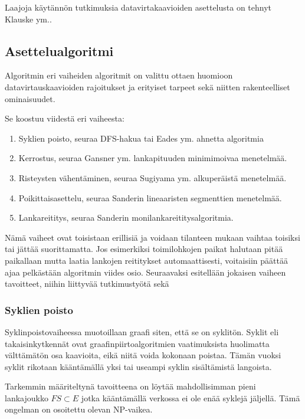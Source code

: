 \documentclass[finnish,12pt]{article}
\begin{document}
Laajoja käytännön tutkimuksia datavirtakaavioiden asettelusta on tehnyt Klauske ym.\cite{RefWorks:50}.

		\subsection{Asettelualgoritmi}

Algoritmin eri vaiheiden algoritmit on valittu ottaen huomioon datavirtauskaavioiden rajoitukset ja erityiset tarpeet sekä niitten rakenteelliset ominaisuudet.

Se koostuu viidestä eri vaiheesta:
\begin{enumerate}
  \item Syklien poisto, seuraa DFS-hakua \cite{RefWorks:69} tai Eades ym. ahnetta algoritmia \cite{RefWorks:48}
  \item Kerrostus, seuraa Gansner ym. lankapituuden minimimoivaa menetelmää. \cite{RefWorks:28}
  \item Risteysten vähentäminen, seuraa Sugiyama ym. alkuperäistä menetelmää. \cite{RefWorks:9}
  \item Poikittaisasettelu, seuraa Sanderin lineaaristen segmenttien menetelmää. \cite{RefWorks:49}
  \item Lankareititys, seuraa Sanderin monilankareititysalgoritmia. \cite{RefWorks:17}
\end{enumerate}

Nämä vaiheet ovat toisistaan erillisiä ja voidaan tilanteen mukaan vaihtaa toisiksi tai jättää suorittamatta.
Jos esimerkiksi toimilohkojen paikat halutaan pitää paikallaan mutta laatia lankojen reititykset automaattisesti, voitaisiin päättää ajaa pelkästään algoritmin viides osio.
Seuraavaksi esitellään jokaisen vaiheen tavoitteet, niihin liittyvää tutkimustyötä sekä

		
		\subsubsection{Syklien poisto}

Syklinpoistovaiheessa muotoillaan graafi siten, että se on syklitön.
Syklit eli takaisinkytkennät ovat graafinpiirtoalgoritmien vaatimuksista huolimatta välttämätön osa kaavioita, eikä niitä voida kokonaan poistaa.
Tämän vuoksi syklit rikotaan kääntämällä yksi tai useampi syklin sisältämistä langoista.

Tarkemmin määriteltynä tavoitteena on löytää mahdollisimman pieni lankajoukko $FS \subset E $ jotka kääntämällä verkossa ei ole enää syklejä jäljellä.
Tämä ongelman on osoitettu olevan NP-vaikea. \cite{RefWorks:65}
\end{document}
